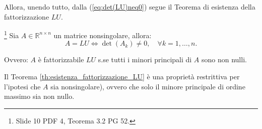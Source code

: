 


Allora, unendo tutto, dalla (\ref{eq:det(LU)neq0}) segue il Teorema di esistenza della fattorizzazione $LU$.

\begin{theorem}\label{th:esistenza_fattorizzazione_LU}\footnote{Slide 10 PDF 4, Teorema 3.2 PG 52.}
    Sia $A\in\mathbb R^{n\times n}$ un matrice \gls{nonsingolare}, allora:
    \begin{equation*}
        A = LU \iff \det(A_k)\neq 0,\quad \forall k=1,\hdots, n.
    \end{equation*}
\end{theorem}
Ovvero: $A$ è fattorizzabile $LU$ s.se tutti i minori principali di $A$ sono non nulli.

\begin{remark}
    Il Teorema \ref{th:esistenza_fattorizzazione_LU} è una proprietà restrittiva per l'ipotesi che $A$ sia \gls{nonsingolare}), ovvero che solo il minore principale di ordine massimo sia non nullo.
\end{remark}

